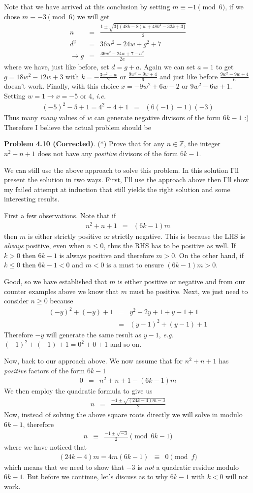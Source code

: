 \documentclass[aps,preprint,preprintnumbers,nofootinbib,showpacs,prd]{revtex4-1}
\newcommand{\ie}{{\it i.e.} }
\newcommand{\eg}{{\it e.g.} }
\newcommand{\nbea}{\begin{eqnarray*}}
\newcommand{\neea}{\end{eqnarray*}}
\begin{document}
Note that we have arrived at this conclusion by setting $m \equiv -1 \pmod{6}$, if we chose $m \equiv -3 \pmod{6}$ we will get
%
\nbea
n & = & \frac{1 \pm \sqrt{3\{(48k-8)w+48k^2-32k+3\}}}{2} \\
d^2 & = & 36w^2-24w+g^2+7 \\
\to g & = & \frac{36w^2-24w+7 - a^2}{2a}
\neea
%
where we have, just like before, set $d = g + a$. Again we can set $a = 1$ to get $g = 18w^2-12w+3$ with $k = -\frac{3w^2-w}{2}$ or $\frac{9w^2-9w+4}{6}$ and just like before $\frac{9w^2-9w+4}{6}$ doesn't work. Finally, with this choice $x = -9w^2+6w-2$ or $9w^2-6w+1$. Setting $w = 1 \to x = -5$ or $4$, \ie
%
\nbea
(-5)^2 - 5 + 1 = 4^2 + 4 + 1 & = & (6(-1) - 1)(-3) 
\neea
%
Thus many {\it many} values of $w$ can generate negative divisors of the form $6k-1$ :) Therefore I believe the actual problem should be

{\bf Problem 4.10 (Corrected)}. (*) Prove that for any $n \in \mathbb{Z}$, the integer $n^2 + n + 1$ does not have any {\it positive} divisors of the form $6k - 1$.

We can still use the above approach to solve this problem. In this solution I'll present the solution in two ways. First, I'll use the approach above then I'll show my failed attempt at induction that still yields the right solution and some interesting results.

First a few observations. Note that if
%
\nbea
n^2 + n + 1 & = & (6k - 1) m
\neea
%
then $m$ is either strictly positive or strictly negative. This is because the LHS is {\it always} positive, even when $n \le 0$, thus the RHS has to be positive as well. If $k > 0$ then $6k - 1$ is always positive and therefore $m > 0$. On the other hand, if $k \le 0$ then $6k - 1 < 0$ and $m < 0$ is a must to ensure $(6k-1)m > 0$.

Good, so we have established that $m$ is either positive or negative and from our counter examples above we know that $m$ must be positive. Next, we just need to consider $n \ge 0$ because
%
\nbea
(-y)^2 + (-y) + 1 & = & y^2 - 2y + 1 + y - 1 + 1 \\
& = & (y - 1)^2 + (y - 1) + 1
\neea
%
Therefore $-y$ will generate the same result as $y - 1$, \eg $(-1)^2 + (-1) + 1 = 0^2 + 0 + 1$ and so on.

Now, back to our approach above. We now assume that for $n^2 + n + 1$ has {\it positive} factors of the form $6k - 1$
%
\nbea
0 & = & n^2 + n + 1 - (6k - 1)m
\neea
%
We then employ the quadratic formula to give us
%
\nbea
n & = & \frac{-1 \pm \sqrt{(24k - 4)m - 3}}{2}
\neea
%
Now, instead of solving the above square roots directly we will solve in modulo $6k - 1$, therefore
%
\nbea
n & \equiv & \frac{-1 \pm \sqrt{-3}}{2} \pmod{6k - 1}
\neea
%
where we have noticed that
%
\nbea
(24k - 4)m = 4m (6k - 1) & \equiv & 0 \pmod{f} 
\neea
%
which means that we need to show that $-3$ is {\it not} a quadratic residue modulo $6k-1$. But before we continue, let's discuss as to why $6k - 1$ with $k<0$ will not work.
\end{document}
